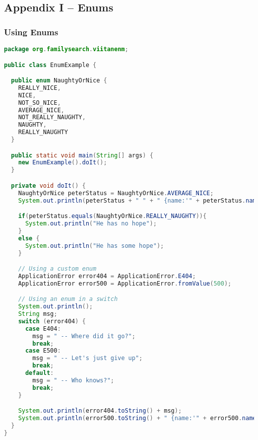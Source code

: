 \subsection*{Appendix I -- Enums} \label{App:AppendixI}
\subsubsection{Using Enums}
\begin{lstlisting}[language=Java]
package org.familysearch.viitanenm;

public class EnumExample {

  public enum NaughtyOrNice {
    REALLY_NICE,
    NICE,
    NOT_SO_NICE,
    AVERAGE_NICE,
    NOT_REALLY_NAUGHTY,
    NAUGHTY,
    REALLY_NAUGHTY
  }

  public static void main(String[] args) {
    new EnumExample().doIt();
  }

  private void doIt() {
    NaughtyOrNice peterStatus = NaughtyOrNice.AVERAGE_NICE;
    System.out.println(peterStatus + " " + " {name:'" + peterStatus.name()+ "', ordinal:'" + peterStatus.ordinal() +"'}");

    if(peterStatus.equals(NaughtyOrNice.REALLY_NAUGHTY)){
      System.out.println("He has no hope");
    }
    else {
      System.out.println("He has some hope");
    }

    // Using a custom enum
    ApplicationError error404 = ApplicationError.E404;
    ApplicationError error500 = ApplicationError.fromValue(500);

    // Using an enum in a switch
    System.out.println();
    String msg;
    switch (error404) {
      case E404:
        msg = " -- Where did it go?";
        break;
      case E500:
        msg = " -- Let's just give up";
        break;
      default:
        msg = " -- Who knows?";
        break;
    }

    System.out.println(error404.toString() + msg);
    System.out.println(error500.toString() + " {name:'" + error500.name()+ "', ordinal:'" + error500.ordinal() +"'}");
  }
}

\end{lstlisting}

